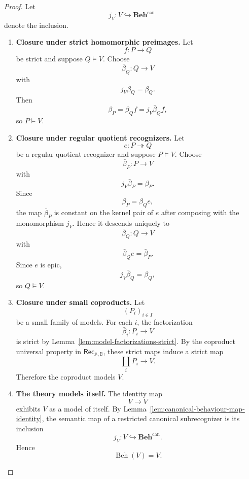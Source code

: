 \begin{proof}
    Let
    \[
        j_V:V\hookrightarrow\mathbf{Beh}^{\mathrm{can}}
    \]
    denote the inclusion.

    \begin{enumerate}
        \item \textbf{Closure under strict homomorphic preimages.}
        Let
        \[
            f:P\to Q
        \]
        be strict and suppose \(Q\models V\). Choose
        \[
            \bar\beta_Q:Q\to V
        \]
        with
        \[
            j_V\bar\beta_Q=\beta_Q.
        \]
        Then
        \[
            \beta_P=\beta_Qf=j_V\bar\beta_Qf,
        \]
        so \(P\models V\).

        \item \textbf{Closure under regular quotient recognizers.}
        Let
        \[
            e:P\twoheadrightarrow Q
        \]
        be a regular quotient recognizer and suppose \(P\models V\). Choose
        \[
            \bar\beta_P:P\to V
        \]
        with
        \[
            j_V\bar\beta_P=\beta_P.
        \]
        Since
        \[
            \beta_P=\beta_Qe,
        \]
        the map \(\bar\beta_P\) is constant on the kernel pair of \(e\) after
        composing with the monomorphism \(j_V\). Hence it descends uniquely to
        \[
            \bar\beta_Q:Q\to V
        \]
        with
        \[
            \bar\beta_Qe=\bar\beta_P.
        \]
        Since \(e\) is epic,
        \[
            j_V\bar\beta_Q=\beta_Q,
        \]
        so \(Q\models V\).

        \item \textbf{Closure under small coproducts.}
        Let
        \[
            (P_i)_{i\in I}
        \]
        be a small family of models. For each \(i\), the factorization
        \[
            \bar\beta_i:P_i\to V
        \]
        is strict by Lemma~\ref{lem:model-factorizations-strict}. By the
        coproduct universal property in
        \(\mathsf{Rec}_{\mathbb A,\mathbb B}\), these strict maps induce a
        strict map
        \[
            \coprod_iP_i\to V.
        \]
        Therefore the coproduct models \(V\).

        \item \textbf{The theory models itself.}
        The identity map
        \[
            V\to V
        \]
        exhibits \(V\) as a model of itself. By
        Lemma~\ref{lem:canonical-behaviour-map-identity}, the semantic map of a
        restricted canonical subrecognizer is its inclusion
        \[
            j_V:V\hookrightarrow\mathbf{Beh}^{\mathrm{can}}.
        \]
        Hence
        \[
            \operatorname{Beh}(V)=V.
        \]


\end{enumerate}
\end{proof}
